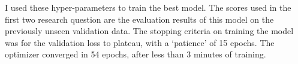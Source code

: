 I used these hyper-parameters to train the best model. The scores used in the first two research question are the evaluation results of this model on the previously unseen validation data. The stopping criteria on training the model was for the validation loss to plateau, with a `patience' of 15 epochs. The optimizer converged in 54 epochs, after less than 3 minutes of training. 
